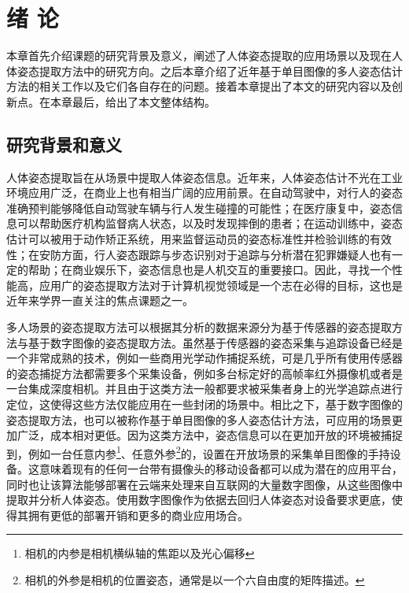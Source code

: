 \chapter{绪 论}
\label{cha:intro}

本章首先介绍课题的研究背景及意义，阐述了人体姿态提取的应用场景以及现在人体姿态提取方法中的研究方向。之后本章介绍了近年基于单目图像的多人姿态估计方法的相关工作以及它们各自存在的问题。接着本章提出了本文的研究内容以及创新点。在本章最后，给出了本文整体结构。

\section{研究背景和意义}
\label{sec:generalbackground}
人体姿态提取旨在从场景中提取人体姿态信息。近年来，人体姿态估计不光在工业环境应用广泛，在商业上也有相当广阔的应用前景。在自动驾驶中，对行人的姿态准确预判能够降低自动驾驶车辆与行人发生碰撞的可能性；在医疗康复中，姿态信息可以帮助医疗机构监督病人状态，以及时发现摔倒的患者；在运动训练中，姿态估计可以被用于动作矫正系统，用来监督运动员的姿态标准性并检验训练的有效性；在安防方面，行人姿态跟踪与步态识别对于追踪与分析潜在犯罪嫌疑人也有一定的帮助；在商业娱乐下，姿态信息也是人机交互的重要接口。因此，寻找一个性能高，应用广的姿态提取方法对于计算机视觉领域是一个志在必得的目标，这也是近年来学界一直关注的焦点课题之一。

多人场景的姿态提取方法可以根据其分析的数据来源分为基于传感器的姿态提取方法与基于数字图像的姿态提取方法。虽然基于传感器的姿态采集与追踪设备已经是一个非常成熟的技术，例如一些商用光学动作捕捉系统，可是几乎所有使用传感器的姿态捕捉方法都需要多个采集设备，例如多台标定好的高帧率红外摄像机或者是一台集成深度相机。并且由于这类方法一般都要求被采集者身上的光学追踪点进行定位，这使得这些方法仅能应用在一些封闭的场景中。相比之下，基于数字图像的姿态提取方法，也可以被称作基于单目图像的多人姿态估计方法，可应用的场景更加广泛，成本相对更低。因为这类方法中，姿态信息可以在更加开放的环境被捕捉到，例如一台任意内参\footnote{相机的内参是相机横纵轴的焦距以及光心偏移}、任意外参\footnote{相机的外参是相机的位置姿态，通常是以一个六自由度的矩阵描述。}的，设置在开放场景的采集单目图像的手持设备。这意味着现有的任何一台带有摄像头的移动设备都可以成为潜在的应用平台，同时也让该算法能够部署在云端来处理来自互联网的大量数字图像，从这些图像中提取并分析人体姿态。使用数字图像作为依据去回归人体姿态对设备要求更底，使得其拥有更低的部署开销和更多的商业应用场合。

